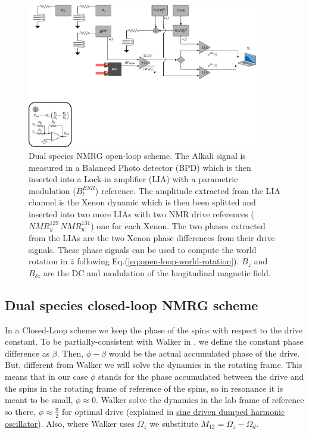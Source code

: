 \documentclass{article}
\begin{document}
\begin{figure}[h]
\centering
\includegraphics[width=0.9\textwidth]{Theory/Figures/NMRG_open_loop_scheme.png}
\caption{Dual species NMRG open-loop scheme. The Alkali signal is measured in a Balanced Photo detector (BPD) which is then inserted into a Lock-in amplifier (LIA) with a parametric modulation ($B^{ESR}_t$) reference. The amplitude extracted from the LIA channel is the Xenon dynamic which is then been splitted and inserted into two more LIAs with two NMR drive references ($NMR^{129}_y\,NMR^{131}_y$) one for each Xenon. The two phases extracted from the LIAs are the two Xenon phase differences from their drive signals. These phase signals can be used to compute the world rotation in $\hat{z}$ following Eq.(\ref{eq:open-loop-world-rotation}). $B_z$ and $B_{\delta z}$ are the DC and modulation of the longitudinal magnetic field.}
\label{fig:open_loop_scheme}
\end{figure}


\subsection{Dual species closed-loop NMRG scheme}
In a Closed-Loop scheme we keep the phase of the spins with respect to the drive constant. To be partially-consistent with Walker in \cite{walker2016spin}, we define the constant phase difference as $\beta$. Then, $\phi-\beta$ would be the actual accumulated phase of the drive. But, different from Walker we will solve the dynamics in the rotating frame. This means that in our case $\phi$ stands for the phase accumulated between the drive and the spins in the rotating frame of reference of the spins, so in resonance it is meant to be small, $\phi\approx 0$. Walker solve the dynamics in the lab frame of reference so there, $\phi\approx \frac{\pi}{2}$ for optimal drive (explained in \href{https://en.wikipedia.org/wiki/Harmonic_oscillator#Sinusoidal_driving_force}{sine driven dumped harmonic oscillator}). Also, where Walker uses $\Omega_z$ we substitute $M_{12}=\Omega_z-\Omega_d$. 
\end{document}
